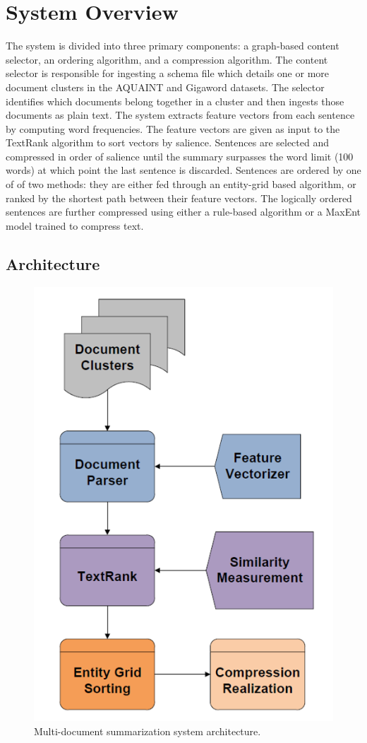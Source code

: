 \documentclass[11pt]{article}
\begin{document}
\section{System Overview}
The system is divided into three primary components: a graph-based content selector, an ordering algorithm, and a compression algorithm. The content selector is responsible for ingesting a schema file which details one or more document clusters in the AQUAINT and Gigaword datasets. The selector identifies which documents belong together in a cluster and then ingests those documents as plain text. The system extracts feature vectors from each sentence by computing word frequencies. The feature vectors are given as input to the  TextRank algorithm to sort vectors by salience. Sentences are selected and compressed in order of salience until the summary surpasses the word limit (100 words) at which point the last sentence is discarded. Sentences are ordered by one of of two methods: they are either fed through an entity-grid based algorithm, or ranked by the shortest path between their feature vectors. The logically ordered sentences are further compressed using either a rule-based algorithm or a MaxEnt model trained to compress text.

\subsection{Architecture}
\begin{figure}
  \includegraphics[width=.9\linewidth,height=.25\textheight,keepaspectratio]{arch_final.png}
  \caption{Multi-document summarization system architecture.}
  \label{fig:arch}
\end{figure}
\end{document}
